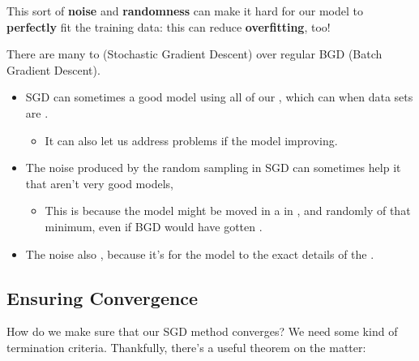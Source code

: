         This sort of \textbf{noise} and \textbf{randomness} can make it hard for our model to \textbf{perfectly} fit the training data: this can reduce \textbf{overfitting}, too!
            
        \begin{concept}
            There are many  to  (Stochastic Gradient Descent) over regular BGD (Batch Gradient Descent).
            
            \begin{itemize}
                \item SGD can sometimes  a good model  using all of our , which can  when data sets are .
                    \begin{itemize}
                        \item It can also let us address problems  if the model  improving.
                    \end{itemize}
                    
                \item The noise produced by the random sampling in SGD can sometimes help it  that aren't very good models, 
                    \begin{itemize}
                        \item This is because the model might be moved in a  in , and randomly  of that minimum, even if BGD would have gotten .
                    \end{itemize}
                    
                \item The noise also , because it's  for the model to  the exact details of the .
            \end{itemize}
        \end{concept}
        
    \subsection{Ensuring Convergence}
    
        How do we make sure that our SGD method converges? We need some kind of termination criteria. Thankfully, there's a useful theorem on the matter:\\
        
